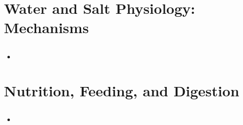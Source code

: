 \documentclass[12pt,a4paper]{article}
\begin{document}
\clearpage
\setcounter{section}{26}
\section{Water and Salt Physiology: Mechanisms}
\subsection{}
\begin{itemize}
    \item 
\end{itemize}

\clearpage
\setcounter{section}{6}
\section{Nutrition, Feeding, and Digestion}
\subsection{}
\begin{itemize}
    \item 
\end{itemize}


\clearpage
{}

\end{document}

